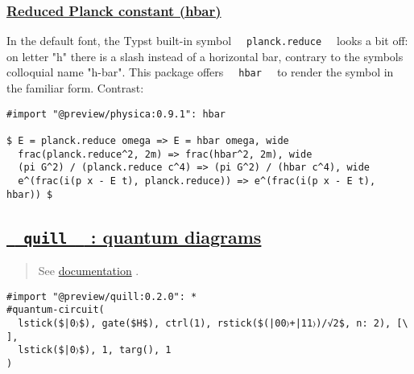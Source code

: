 \pandocbounded{}

\subsubsection{\texorpdfstring{\hyperref[reduced-planck-constant-hbar]{Reduced
Planck constant
(hbar)}}{Reduced Planck constant (hbar)}}\label{reduced-planck-constant-hbar}

In the default font, the Typst built-in symbol
\texttt{\ }{\texttt{\ planck.reduce\ }}\texttt{\ } looks a bit off: on
letter "h" there is a slash instead of a horizontal bar, contrary to the
symbol\textquotesingle s colloquial name "h-bar". This package offers
\texttt{\ }{\texttt{\ hbar\ }}\texttt{\ } to render the symbol in the
familiar form⁠. Contrast:

\begin{verbatim}
#import "@preview/physica:0.9.1": hbar

$ E = planck.reduce omega => E = hbar omega, wide
  frac(planck.reduce^2, 2m) => frac(hbar^2, 2m), wide
  (pi G^2) / (planck.reduce c^4) => (pi G^2) / (hbar c^4), wide
  e^(frac(i(p x - E t), planck.reduce)) => e^(frac(i(p x - E t), hbar)) $
\end{verbatim}

\pandocbounded{}

\subsection{\texorpdfstring{\hyperref[quill-quantum-diagrams]{\texttt{\ }{\texttt{\ quill\ }}\texttt{\ }
: quantum
diagrams}}{  quill   : quantum diagrams}}\label{quill-quantum-diagrams}

\begin{quote}
See \href{https://github.com/Mc-Zen/quill/tree/main}{documentation} .
\end{quote}

\begin{verbatim}
#import "@preview/quill:0.2.0": *
#quantum-circuit(
  lstick($|0〉$), gate($H$), ctrl(1), rstick($(|00〉+|11〉)/√2$, n: 2), [\ ],
  lstick($|0〉$), 1, targ(), 1
)
\end{verbatim}

\pandocbounded{}


